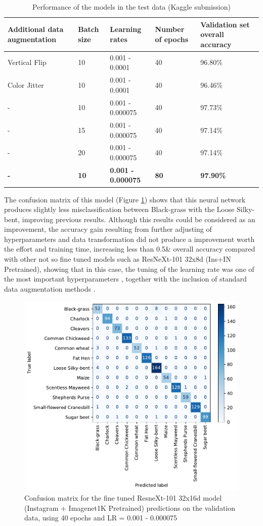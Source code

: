 \documentclass[10pt,onecolumn,titlepage,letterpaper]{article}
\begin{document}
\begin{table}[h]
	\begin{center}
		\begin{tabular}{|p{2.8cm}|p{2.8cm}|p{2.8cm}|p{2.8cm}|p{2.8cm}|}
			\hline
			Additional data augmentation & Batch size & Learning rates & Number of epochs & Validation set overall accuracy \\
			\hline\hline
			Vertical Flip & 10 & 0.001 - 0.0001 & 40 & 96.80\% \\
			Color Jitter & 10 & 0.001 - 0.0001 & 40 & 96.46\%  \\
			- & 10 & 0.001 - 0.000075 & 40 & 97.73\% \\
			- & 15 & 0.001 - 0.000075 & 40 & 97.14\%  \\
			- & 20 & 0.001 - 0.000075 & 40 & 97.14\%  \\
			\textbf{-} & \textbf{10} &\textbf{0.001 - 0.000075} & \textbf{80} & \textbf{97.90\%}  \\
			\hline
		\end{tabular}
	\end{center}
	\caption{Performance of the models in the test data (Kaggle submission)}
	\label{table:finetune}
\end{table}

The confusion matrix of this model (Figure \ref{fig:cm2}) shows that this neural network produces slightly less misclassification between Black-grass with the Loose Silky-bent, improving previous results. Although this results could be considered as an improvement, the accuracy gain resulting from further adjusting of hyperparameters and data transformation did not produce a improvement worth the effort and training time, increasing less than 0.5\& overall accuracy compared with other not so fine tuned models such as ResNeXt-101 32x8d (Ins+IN Pretrained), showing that in this case, the tuning of the learning rate was one of the most important hyperparameters , together with the inclusion of standard data augmentation methods \cite{Shorten2019}.

\begin{figure}[h]
	\begin{center}
		\includegraphics[width=0.6\linewidth]{confusion_matrix_finetune.pdf}
	\end{center}
	\caption{Confusion matrix for the fine tuned ResneXt-101 32x16d model (Instagram + Imagenet1K Pretrained) predictions on the validation data, using 40 epochs and LR = 0.001 - 0.000075}
	\label{fig:cm2}
\end{figure}
\end{document}
